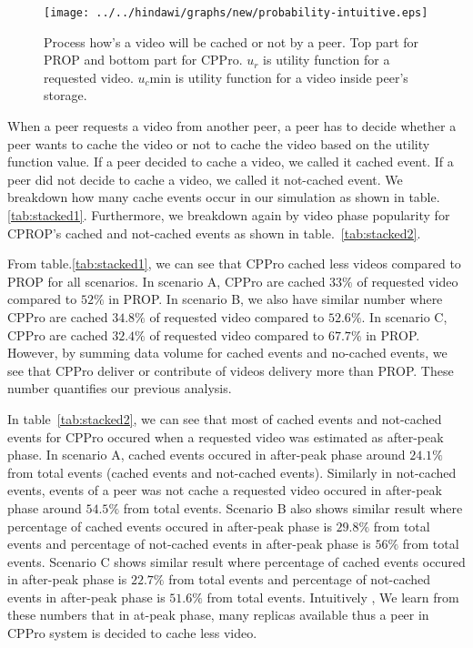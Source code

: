 \begin{figure}[!t]
\begin{center}
\texttt{[image: ../../hindawi/graphs/new/probability-intuitive.eps]}
\end{center}
\caption{Process how's a video will be cached or not by a peer. Top part for PROP and bottom part for CPPro. 
$u_r$ is utility function for a requested video.  
$u_c$min is utility function for a video inside peer's storage.
}
\label{fig:cached-notcached}
\end{figure} 


When a peer requests a video from another peer, a peer has to decide whether a peer wants to cache the video or not to cache the video based on the utility function value.  
If a peer decided to cache a video, we called it cached event.
If a peer did not decide to cache a video, we called it not-cached event.
We breakdown how many cache events occur in our simulation as shown in table.\ref{tab:stacked1}.
Furthermore, we breakdown again by video phase popularity for CPROP's cached and not-cached events as shown in table.~\ref{tab:stacked2}.

From table.\ref{tab:stacked1}, we can see that CPPro cached less videos compared to PROP for all scenarios.
In scenario A, CPPro are cached $33\%$ of requested video compared to $52\%$ in PROP.  
In scenario B, we also have similar number where CPPro are cached $34.8\%$ of requested video compared to $52.6\%$. 
In scenario C, CPPro are cached $32.4\%$ of requested video compared to $67.7\%$ in PROP.
However, by summing data volume for cached events and no-cached events, we see that CPPro deliver or contribute of videos delivery more than PROP. 
These number quantifies our previous analysis. 

In table~\ref{tab:stacked2}, we can see that most of cached events and not-cached events for CPPro occured when a requested video was estimated as after-peak phase.
In scenario A, cached events occured in after-peak phase around $24.1\%$ from total events (cached events and not-cached events). 
Similarly in not-cached events, events of a peer was not cache a requested video occured in after-peak phase around $54.5\%$ from total events.
Scenario B also shows similar result where percentage of cached events occured in after-peak phase is $29.8\%$ from total events and percentage of not-cached events in after-peak phase is $56\%$ from total events.
Scenario C shows similar result where percentage of cached events occured in after-peak phase is $22.7\%$ from total events and percentage of not-cached events in after-peak phase is $51.6\%$ from total events.
Intuitively , We learn from these numbers that in at-peak phase, many replicas available thus a peer in CPPro system is decided to cache less video.


